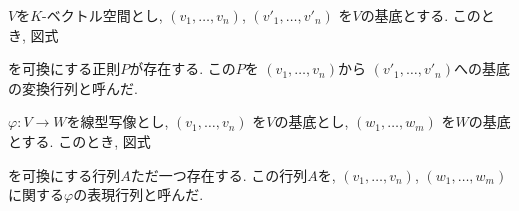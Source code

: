 $V$を$K$-ベクトル空間とし,
$(v_1,\ldots,v_n)$,
$(v'_1,\ldots,v'_n)$
を$V$の基底とする.
このとき, 図式
\begin{center}
\end{center}
を可換にする正則$P$が存在する.
この$P$を
$(v_1,\ldots,v_n)$から
$(v'_1,\ldots,v'_n)$への基底の変換行列と呼んだ.

$\varphi\colon V\to W$を線型写像とし,
$(v_1,\ldots,v_n)$
を$V$の基底とし,
$(w_1,\ldots,w_m)$
を$W$の基底とする.
このとき, 図式
\begin{center}
\end{center}
を可換にする行列$A$ただ一つ存在する.
この行列$A$を,
$(v_1,\ldots,v_n)$,
$(w_1,\ldots,w_m)$
に関する$\varphi$の表現行列と呼んだ.


